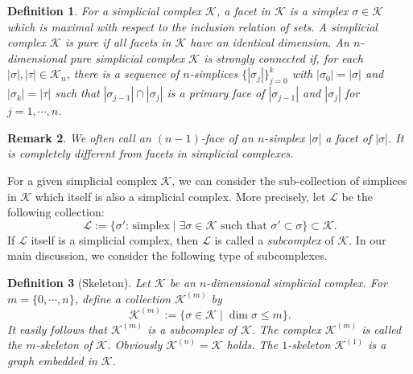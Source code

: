\documentclass[a4paper,12pt]{article}
\newtheorem{definition}{Definition}[section]
\newtheorem{remark}[definition]{Remark}
\numberwithin{equation}{section}
\begin{document}
\begin{definition}\rm
\label{dfn-strong-conn}
For a simplicial complex $\mathcal{K}$, a {\em facet} in $\mathcal{K}$ is a simplex $\sigma \in \mathcal{K}$ which is maximal with respect to the inclusion relation of sets. A simplicial complex $\mathcal{K}$ is {\em pure} if all facets in $\mathcal{K}$ have an identical dimension. An $n$-dimensional pure simplicial complex $\mathcal{K}$ is {\em strongly connected} if, for each $|\sigma|, |\tau| \in \mathcal{K}_n$, there is a sequence of $n$-simplices $\{|\sigma_j|\}_{j=0}^k$ with $|\sigma_0| = |\sigma|$ and $|\sigma_k| = |\tau|$ such that $|\sigma_{j-1}| \cap |\sigma_j|$ is a primary face of $|\sigma_{j-1}|$ and $|\sigma_j|$ for $j=1,\cdots, n$. 
\end{definition}

\begin{remark}\rm
We often call an $(n-1)$-face of an $n$-simplex $|\sigma|$ {\em a facet of $|\sigma|$}. It is completely different from facets in simplicial complexes.
\end{remark}
%
For a given simplicial complex $\mathcal{K}$, we can consider the sub-collection of simplices in $\mathcal{K}$ which itself is also a simplicial complex.
More precisely, let $\mathcal{L}$ be the following collection:
\begin{equation*}
\mathcal{L} := \{\sigma' \text{: simplex}\mid \exists \sigma\in \mathcal{K} \text{ such that }\sigma'\subset \sigma\} \subset \mathcal{K}.
\end{equation*}
If $\mathcal{L}$ itself is a simplicial complex, then $\mathcal{L}$ is called a {\em subcomplex} of $\mathcal{K}$.
In our main discussion, we consider the following type of subcomplexes.

\begin{definition}[Skeleton]\rm
Let $\mathcal{K}$ be an $n$-dimensional simplicial complex.
For $m=\{0,\cdots, n\}$, define a collection $\mathcal{K}^{(m)}$ by
\begin{equation*}
\mathcal{K}^{(m)} := \{\sigma \in \mathcal{K} \mid \dim \sigma \leq m\}.
\end{equation*}
It easily follows that $\mathcal{K}^{(m)}$ is a subcomplex of $\mathcal{K}$.
The complex $\mathcal{K}^{(m)}$ is called the {\em $m$-skeleton} of $\mathcal{K}$.
Obviously $\mathcal{K}^{(n)} = \mathcal{K}$ holds.
The $1$-skeleton $\mathcal{K}^{(1)}$ is a graph embedded in $\mathcal{K}$.
\end{definition}


\end{document}
